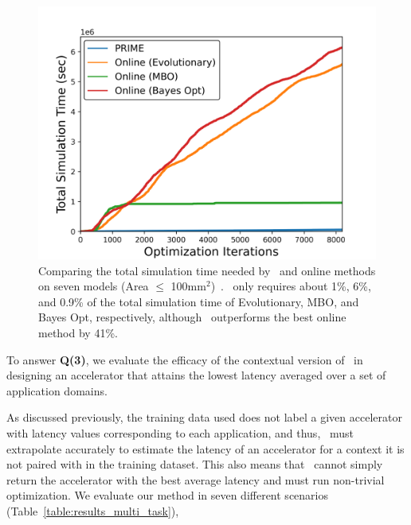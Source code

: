 \begin{figure}
    \centering
    \vspace{-0.7cm}
    \includegraphics[width=0.98\linewidth]{chapters/prime/figs/motivation/convergence_time_seven_models.png}
    \vspace{-0.25cm}
    \caption{\footnotesize{Comparing the total simulation time needed by \primemethodname\ and online methods on seven models (Area $\leq$ 100mm$^2$)~. \primemethodname\ only requires about 1\%, 6\%, and 0.9\% of the total simulation time of Evolutionary, MBO, and Bayes Opt, respectively, although \primemethodname\ outperforms the best online method by 41\%.}}
    \vspace{-0.6cm}
    \label{fig:convergence_time_seven_models}
\end{figure}
%
To answer \textbf{Q(3)}, we evaluate the efficacy of the contextual version of \primemethodname\ in designing an accelerator that attains the lowest latency averaged over a set of application domains.
%

%
As discussed previously, the training data used does not label a given accelerator with latency values corresponding to each application, and thus, \primemethodname\ must extrapolate accurately to estimate the latency of an accelerator for a context it is not paired with in the training dataset.
%
This also means that \primemethodname\ cannot simply return the accelerator with the best average latency and must run non-trivial optimization. 
%
We evaluate our method in seven different scenarios (Table~\ref{table:results_multi_task}), 
